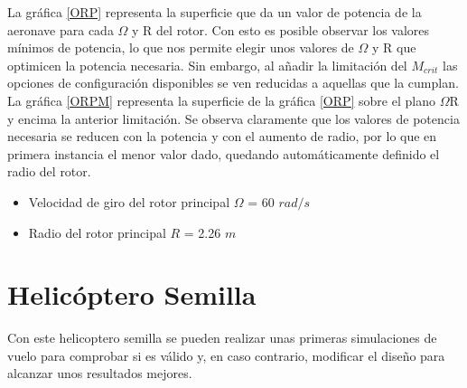 La gráfica \ref{ORP} representa la superficie que da un valor de potencia de la aeronave para cada $\Omega$ y R del rotor. Con esto es posible observar los valores mínimos de potencia, lo que nos permite elegir unos valores de $\Omega$ y R que optimicen la potencia necesaria.
Sin embargo, al añadir la limitación del $M_{crit}$ las opciones de configuración disponibles se ven reducidas a aquellas que la cumplan. La gráfica \ref{ORPM} representa la superficie de la gráfica \ref{ORP} sobre el plano $\Omega$R y encima la anterior limitación.
Se observa claramente que los valores de potencia necesaria se reducen con la potencia y con el aumento de radio, por lo que en primera instancia el menor valor dado, quedando automáticamente definido el radio del rotor.
\begin{itemize}
	\item Velocidad de giro del rotor principal $\Omega$ = 60 $rad/s$
	\item Radio del rotor principal $R$ = 2.26 $m$
\end{itemize}

\section{Helicóptero Semilla}

Con este helicoptero semilla se pueden realizar unas primeras simulaciones de vuelo para comprobar si es válido y, en caso contrario, modificar el diseño para alcanzar unos resultados mejores.